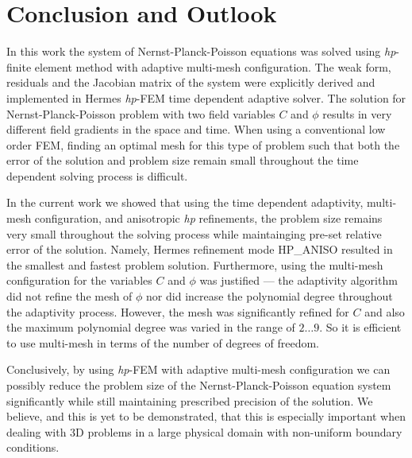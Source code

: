 \section{Conclusion and Outlook}\label{sec:conc}

In this work the system of Nernst-Planck-Poisson equations
was solved using \emph{hp}-finite element method with adaptive
multi-mesh configuration. The weak form, residuals and
the Jacobian matrix of the system were explicitly derived
and implemented in Hermes \emph{hp}-FEM time dependent
adaptive solver.
The solution for Nernst-Planck-Poisson
problem with two field variables $C$ and $\phi$ results in 
very different field gradients in the space and time.
When using a conventional low order
FEM, finding an optimal mesh for this
type of problem such that both the error of
the solution and problem size remain small throughout the
time dependent solving process is difficult. 

In the current work we showed that using the time dependent adaptivity, 
multi-mesh configuration, and anisotropic \emph{hp} refinements, the problem
size remains very small throughout the solving process while
maintainging pre-set relative error of the solution.
Namely, Hermes refinement mode HP\_ANISO 
resulted in the smallest and fastest problem solution.
Furthermore, using the multi-mesh configuration for the variables
$C$ and $\phi$ was justified --- the adaptivity algorithm
did not refine the mesh of $\phi$ nor did increase the
polynomial degree throughout the adaptivity process. However,
the mesh was significantly refined for $C$ and also the
maximum polynomial degree was varied in the range of
$2\ldots 9$. So it is efficient to use multi-mesh in terms of
the number of degrees of freedom.

Conclusively, by using \emph{hp}-FEM with adaptive multi-mesh
configuration we can possibly reduce the problem size
of the Nernst-Planck-Poisson equation system significantly while
still maintaining prescribed precision of the solution. 
We believe, and this
is yet to be demonstrated, that this is especially
important when dealing with 3D problems in a large physical
domain with non-uniform boundary conditions.
